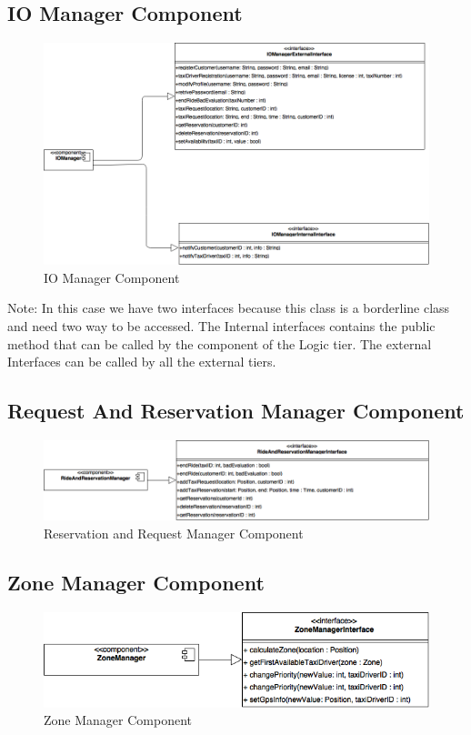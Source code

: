 \documentclass[../../../../dd.tex]{subfiles}
\begin{document}
		\subsection{IO Manager Component}
		\begin{figure}[H]
				\centering
				\includegraphics[width=\textwidth, scale=0.5]{../images/IOManagerComponent.png}
			\caption{IO Manager Component}\label{fig:IOMC}
		\end{figure}
		Note: In this case we have two interfaces because this class is a borderline class and need two way to be accessed. The Internal interfaces contains the public method that can be called by the component of the Logic tier. The external Interfaces can be called by all the external tiers.
	
	\subsection{Request And Reservation Manager Component}
	\begin{figure}[H]
				\centering
				\includegraphics[width=\textwidth, scale=0.5]{../images/RequestAndReservationManager.png}
			\caption{Reservation and Request Manager Component}\label{fig:RARMC}
		\end{figure}
		
		\subsection{Zone Manager Component}
		\begin{figure}[H]
				\centering
				\includegraphics[width=\textwidth, scale=0.5]{../images/ZoneManagerComponent.png}
			\caption{Zone Manager Component}\label{fig:ZMC}
		\end{figure}
		
\end{document}
